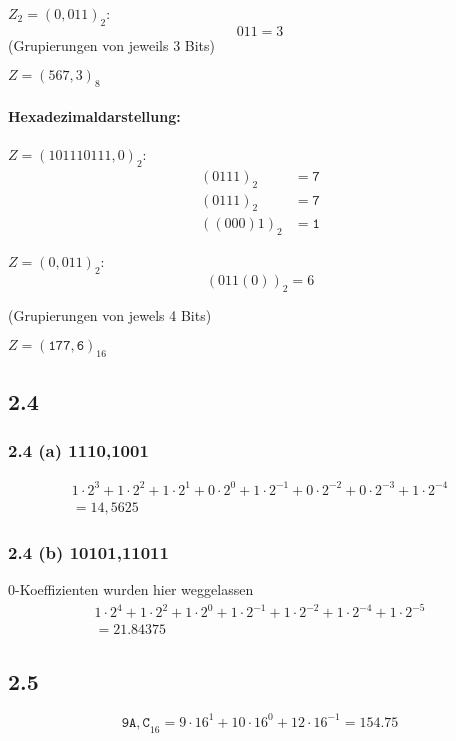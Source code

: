 \documentclass[11pt,a4paper]{article}
\begin{document}
$Z_2 = (0,011)_2$:
\begin{equation*}
011 = 3
\end{equation*}
(Grupierungen von jeweils 3 Bits)

$Z = (567,3)_8$

\paragraph{Hexadezimaldarstellung:}

$Z = (101110111,0)_2$:
\begin{align*}
(0111)_2 &= \mathtt{7}\\
(0111)_2 &= \mathtt{7}\\
((000)1)_2 &= \mathtt{1}
\end{align*}

$Z = (0,011)_2$:
\begin{equation*}
(011(0))_2 = 6
\end{equation*}

(Grupierungen von jewels 4 Bits)

$Z = (\mathtt{177,6})_{16}$

\subsection{2.4}

\subsubsection{2.4 (a) 1110,1001}
\begin{align*}
1\cdot2^3 + 1\cdot2^2 + 1\cdot2^1 + 0\cdot2^0 + 1\cdot2^{-1} + 0\cdot2^{-2} + 0\cdot2^{-3} + 1\cdot2^{-4}\\
= 14,5625
\end{align*}

\subsubsection{2.4 (b) 10101,11011}
0-Koeffizienten wurden hier weggelassen
\begin{align*}
1\cdot2^4 + 1\cdot2^2 + 1\cdot2^0 + 1\cdot2^{-1} + 1\cdot2^{-2} + 1\cdot2^{-4} + 1\cdot2^{-5}\\
= 21.84375
\end{align*}


\subsection{2.5}
\begin{equation*}
\mathtt{9A,C}_{16} = 9\cdot16^1 + 10\cdot16^0 + 12\cdot16^{-1} = 154.75
\end{equation*}

\newpage



\end{document}

